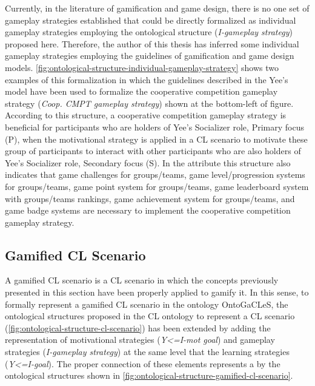 Currently, in the literature of gamification and game design, there is no one set of gameplay strategies established that could be directly formalized as individual gameplay strategies employing the ontological structure (\emph{I-gameplay strategy}) proposed here. Therefore, the author of this thesis has inferred some individual gameplay strategies employing the guidelines of gamification and game design models. \autoref{fig:ontological-structure-individual-gameplay-strategy} shows two examples of this formalization in which the guidelines described in the Yee's model \cite{Yee2006} have been used to formalize the cooperative competition gameplay strategy (\emph{Coop. CMPT gameplay strategy}) shown at the bottom-left of figure. According to this structure, a cooperative competition gameplay strategy is beneficial for participants who are holders of Yee's Socializer role, Primary focus (P), when the motivational strategy  is applied in a CL scenario to motivate these group of participants to interact with other participants who are also holders of Yee's Socializer role, Secondary focus (S). In the attribute  this structure also indicates that game challenges for groups/teams, game level/progression systems for groups/teams, game point system for groups/teams, game leaderboard system with groups/teams rankings, game achievement system for groups/teams, and game badge systems are necessary to implement the cooperative competition gameplay strategy.

\subsection{Gamified CL Scenario}
\label{subsec:gamified-cl-scenario}

A gamified CL scenario is a CL scenario in which the concepts previously presented in this section have been properly applied to gamify it. In this sense, to formally represent a gamified CL scenario in the ontology OntoGaCLeS, the ontological structures proposed in the CL ontology to represent a CL scenario (\autoref{fig:ontological-structure-cl-scenario}) has been extended by adding the representation of motivational strategies (\emph{Y<=I-mot goal}) and gameplay strategies (\emph{I-gameplay strategy}) at the same level that the learning strategies (\emph{Y<=I-goal}). The proper connection of these elements represents a  by the ontological structures shown in \autoref{fig:ontological-structure-gamified-cl-scenario}.

